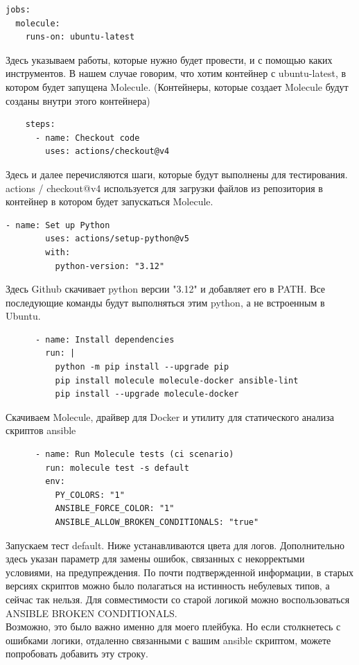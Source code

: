 \documentclass[12pt]{article}
\begin{document}
\begin{lstlisting}
jobs:
  molecule:
    runs-on: ubuntu-latest
\end{lstlisting}\par
Здесь указываем работы, которые нужно будет провести, и с помощью каких инструментов. В нашем случае говорим, что хотим контейнер с ubuntu-latest, в котором будет запущена Molecule. (Контейнеры, которые создает Molecule будут созданы внутри этого контейнера)
\begin{lstlisting}
    steps:
      - name: Checkout code
        uses: actions/checkout@v4
\end{lstlisting}\par
Здесь и далее перечисляются шаги, которые будут выполнены для тестирования.\\
actions / checkout@v4 используется для загрузки файлов из репозитория в контейнер в котором будет запускаться Molecule.\par\vspace{10pt}
\begin{lstlisting}
- name: Set up Python
        uses: actions/setup-python@v5
        with:
          python-version: "3.12"
\end{lstlisting}\par
Здесь Github скачивает python версии "3.12" и добавляет его в PATH. Все последующие команды будут выполняться этим python, а не встроенным в Ubuntu.\par\vspace{10pt}
\begin{lstlisting}
      - name: Install dependencies
        run: |
          python -m pip install --upgrade pip
          pip install molecule molecule-docker ansible-lint
          pip install --upgrade molecule-docker
\end{lstlisting}\par
Скачиваем Molecule, драйвер для Docker и утилиту для статического анализа скриптов ansible\par\vspace{10pt}
\newpage

\begin{lstlisting}
      - name: Run Molecule tests (ci scenario)
        run: molecule test -s default
        env:
          PY_COLORS: "1"
          ANSIBLE_FORCE_COLOR: "1"
          ANSIBLE_ALLOW_BROKEN_CONDITIONALS: "true"
\end{lstlisting}\par
Запускаем тест default. Ниже устанавливаются цвета для логов. 
Дополнительно здесь указан параметр для замены ошибок, связанных с некорректыми условиями, на предупреждения. По почти подтвержденной информации, в старых версиях скриптов можно было полагаться на истинность небулевых типов, а сейчас так нельзя. Для совместимости со старой логикой можно воспользоваться ANSIBLE BROKEN CONDITIONALS. \\
Возможно, это было важно именно для моего плейбука. Но если столкнетесь с ошибками логики, отдаленно связанными с вашим ansible скриптом, можете попробовать добавить эту строку.\par\vspace{10pt}
\end{document}
